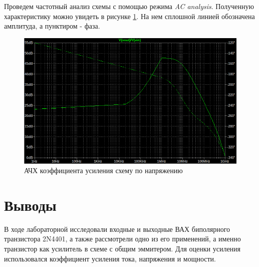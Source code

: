 Проведем частотный анализ схемы с помощью режима \textit{AC analysis}. Полученную характеристику
можно увидеть в рисунке \ref{fig:ачх}. На нем сплошной линией обозначена амплитуда, а пунктиром - фаза.
\begin{figure}[H]
    \centering
    \includegraphics[width=1\textwidth]{figs/ачх.png}
    \caption{АЧХ коэффициента усиления схему по напряжению}
    \label{fig:ачх}
\end{figure}

\section*{Выводы}

В ходе лабораторной исследовали входные и выходные ВАХ биполярного
транзистора 2N4401, а также рассмотрели одно из его применений, а именно транзистор как
усилитель в схеме с общим эммитером. Для оценки усиления использовался коэффициент усиления тока, 
напряжения и мощности.


